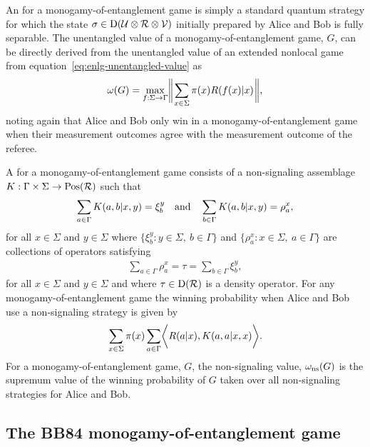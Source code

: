 An  for a monogamy-of-entanglement game is simply a standard quantum strategy for which the state $\sigma \in \mathrm{D}(\mathcal{U} \otimes \mathcal{R} \otimes \mathcal{V})$ initially prepared by Alice and Bob is fully separable. The unentangled value of a monogamy-of-entanglement game, $G$, can be directly derived from the unentangled value of an extended nonlocal game from equation~\eqref{eq:enlg-unentangled-value} as 
\begin{align} \label{eq:monogamy-unentangled-value}
	\omega(G) = \max_{f : \Sigma \rightarrow \Gamma} \biggl\lVert\mspace{1mu} \sum_{x \in \Sigma} \pi(x) R(f(x)|x)  \mspace{1mu}\biggr\rVert,
\end{align}
noting again that Alice and Bob only win in a monogamy-of-entanglement game when their measurement outcomes agree with the measurement outcome of the referee. 

A  for a monogamy-of-entanglement game consists of a non-signaling assemblage $K : \Gamma \times \Sigma \rightarrow \mathrm{Pos}(\mathcal{R})$ such that 
\begin{align}
	\sum_{a \in \Gamma} K(a,b|x,y) = \xi_b^y \quad \textnormal{and} \quad \sum_{b \in \Gamma} K(a,b|x,y) = \rho_a^x,
\end{align}
for all $x \in \Sigma$ and $y \in \Sigma$ where $\{\xi_b^y : y \in \Sigma, \ b \in \Gamma \}$ and $\{ \rho_a^x : x \in \Sigma, \ a \in \Gamma \}$ are collections of operators satisfying 
\begin{align}
	\sum_{a \in \Gamma} \rho_a^x = \tau = \sum_{b \in \Gamma} \xi_b^y,
\end{align}
for all $x \in \Sigma$ and $y \in \Sigma$ and where $\tau \in \mathrm{D}(\mathcal{R})$ is a density operator. For any monogamy-of-entanglement game the winning probability when Alice and Bob use a non-signaling strategy is given by 
\begin{align}
	\sum_{x \in \Sigma} \pi(x) \sum_{a \in \Gamma} \biggl\langle R(a|x), K(a,a|x,x) \biggr\rangle.
\end{align}
For a monogamy-of-entanglement game, $G$, the non-signaling value, $\omega_{\textnormal{ns}}(G)$ is the supremum value of the winning probability of $G$ taken over all non-signaling strategies for Alice and Bob.



\subsection{The BB84 monogamy-of-entanglement game} \label{sec:the-bb84-monogamy-of-entanglement-game}

